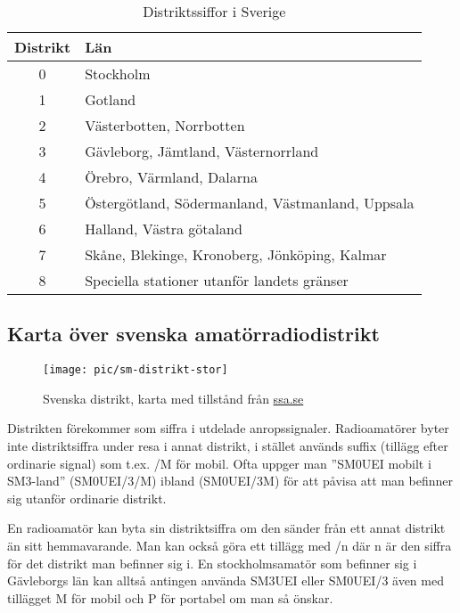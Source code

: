 \begin{table}[h]
	\centering
\begin{tabular}{cl}
	\textbf{Distrikt} & \textbf{Län}                                     \\ \hline %
	      0           & Stockholm                                        \\
	      1           & Gotland                                          \\
	      2           & Västerbotten, Norrbotten                         \\
	      3           & Gävleborg, Jämtland, Västernorrland              \\
	      4           & Örebro, Värmland, Dalarna                        \\
	      5           & Östergötland, Södermanland, Västmanland, Uppsala \\
	      6           & Halland, Västra götaland                         \\
	      7           & Skåne, Blekinge, Kronoberg, Jönköping, Kalmar    \\
	      8           & Speciella stationer utanför landets gränser
\end{tabular}
\caption{Distriktssiffor i Sverige}
\end{table}

\subsection{Karta över svenska amatörradiodistrikt}

\begin{figure}
	\centering
	\texttt{[image: pic/sm-distrikt-stor]}
	\label{fig:sm-distrikt}
	\caption{Svenska distrikt, karta med tillstånd från
          \href{https://SSA.SE}{ssa.se}}
\end{figure}

Distrikten förekommer som siffra i utdelade anropssignaler. Radioamatörer byter
inte distriktsiffra under resa i annat distrikt, i stället används suffix
(tillägg efter ordinarie signal) som t.ex. /M för mobil. Ofta uppger man ''SM0UEI
mobilt i SM3-land'' (SM0UEI/3/M) ibland (SM0UEI/3M) för att påvisa att man
befinner sig utanför ordinarie distrikt.

En radioamatör kan byta sin distriktsiffra om den sänder från ett annat distrikt
än sitt hemmavarande. Man kan också göra ett tillägg med /n där n är den siffra
för det distrikt man befinner sig i. En stockholmsamatör som befinner sig i
Gävleborgs län kan alltså antingen använda SM3UEI eller SM0UEI/3 även med
tillägget M för mobil och P för portabel om man så önskar.

